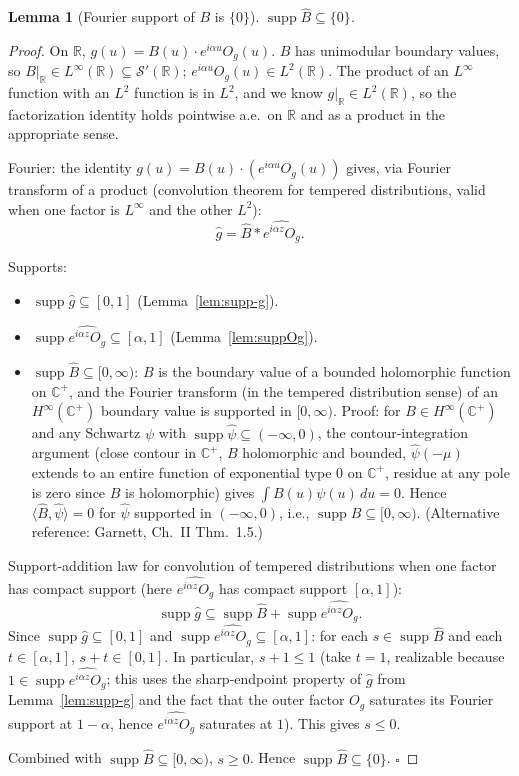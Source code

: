 \documentclass[11pt]{article}
\newtheorem{lemma}[theorem]{Lemma}
\theoremstyle{definition}
\newcommand{\R}{\mathbb{R}}
\newcommand{\C}{\mathbb{C}}
\newcommand{\Cp}{\C^{+}}
\newcommand{\supp}{\operatorname{supp}}
\begin{document}
\begin{lemma}[Fourier support of $B$ is $\{0\}$]\label{lem:suppB}
$\supp\hat B\subseteq\{0\}$.
\end{lemma}

\begin{proof}
On $\R$, $g(u)=B(u)\cdot e^{i\alpha u}O_g(u)$. $B$ has unimodular boundary values, so $B|_\R\in L^\infty(\R)\subseteq\mathcal S'(\R)$; $e^{i\alpha u}O_g(u)\in L^2(\R)$. The product of an $L^\infty$ function with an $L^2$ function is in $L^2$, and we know $g|_\R\in L^2(\R)$, so the factorization identity holds pointwise a.e.\ on $\R$ and as a product in the appropriate sense.

Fourier: the identity $g(u)=B(u)\cdot(e^{i\alpha u}O_g(u))$ gives, via Fourier transform of a product (convolution theorem for tempered distributions, valid when one factor is $L^\infty$ and the other $L^2$):
\[
\hat g=\hat B\ast\widehat{e^{i\alpha z}O_g}.
\]

Supports:
\begin{itemize}
\item $\supp\hat g\subseteq[0,1]$ (Lemma~\ref{lem:supp-g}).
\item $\supp\widehat{e^{i\alpha z}O_g}\subseteq[\alpha,1]$ (Lemma~\ref{lem:suppOg}).
\item $\supp\hat B\subseteq[0,\infty)$: $B$ is the boundary value of a bounded holomorphic function on $\Cp$, and the Fourier transform (in the tempered distribution sense) of an $H^\infty(\Cp)$ boundary value is supported in $[0,\infty)$. Proof: for $B\in H^\infty(\Cp)$ and any Schwartz $\psi$ with $\supp\hat\psi\subseteq(-\infty,0)$, the contour-integration argument (close contour in $\Cp$, $B$ holomorphic and bounded, $\hat\psi(-\mu)$ extends to an entire function of exponential type $0$ on $\Cp$, residue at any pole is zero since $B$ is holomorphic) gives $\int B(u)\psi(u)\,du=0$. Hence $\langle\hat B,\hat\psi\rangle=0$ for $\hat\psi$ supported in $(-\infty,0)$, i.e., $\supp\hat B\subseteq[0,\infty)$. (Alternative reference: Garnett, Ch.~II Thm.~1.5.)
\end{itemize}

Support-addition law for convolution of tempered distributions when one factor has compact support (here $\widehat{e^{i\alpha z}O_g}$ has compact support $[\alpha,1]$):
\[
\supp\hat g\subseteq\supp\hat B+\supp\widehat{e^{i\alpha z}O_g}.
\]
Since $\supp\hat g\subseteq[0,1]$ and $\supp\widehat{e^{i\alpha z}O_g}\subseteq[\alpha,1]$: for each $s\in\supp\hat B$ and each $t\in[\alpha,1]$, $s+t\in[0,1]$. In particular, $s+1\le 1$ (take $t=1$, realizable because $1\in\supp\widehat{e^{i\alpha z}O_g}$; this uses the sharp-endpoint property of $\hat g$ from Lemma~\ref{lem:supp-g} and the fact that the outer factor $O_g$ saturates its Fourier support at $1-\alpha$, hence $\widehat{e^{i\alpha z}O_g}$ saturates at $1$). This gives $s\le 0$.

Combined with $\supp\hat B\subseteq[0,\infty)$, $s\ge 0$. Hence $\supp\hat B\subseteq\{0\}$. $\square$
\end{proof}
\end{document}
